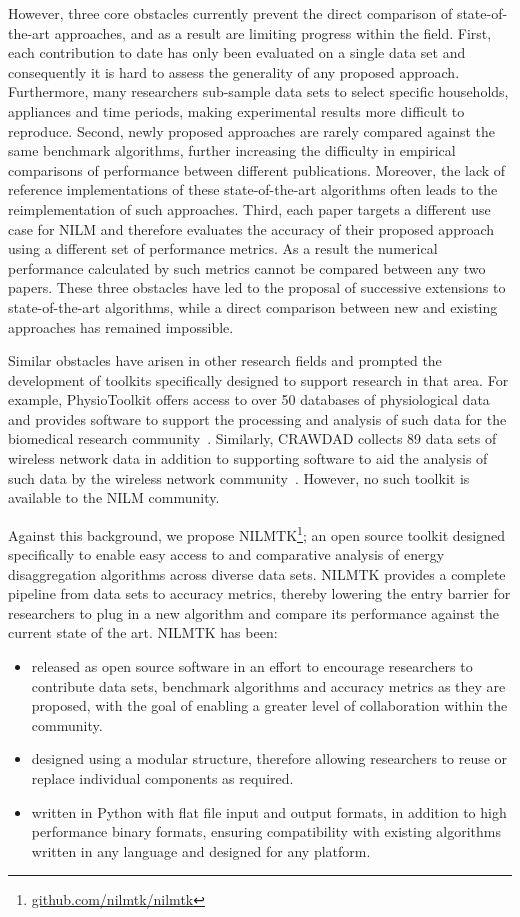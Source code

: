 \documentclass{sig-alternate}
\begin{document}
However, three core obstacles currently prevent the direct comparison of state-of-the-art approaches, and as a result are limiting progress within the field. First, each contribution to date has only been evaluated on a single data set and consequently it is hard to assess the generality of any proposed approach. Furthermore, many researchers sub-sample data sets to select specific households, appliances and time periods, making experimental results more difficult to reproduce. Second, newly proposed approaches are rarely compared against the same benchmark algorithms, further increasing the difficulty in empirical comparisons of performance between different publications. Moreover, the lack of reference implementations of these state-of-the-art algorithms often leads to the reimplementation of such approaches. Third, each paper targets a different use case for NILM and therefore evaluates the accuracy of their proposed approach using a different set of performance metrics. As a result the numerical performance calculated by such metrics cannot be compared between any two papers. These three obstacles have led to the proposal of successive extensions to state-of-the-art algorithms, while a direct comparison between new and existing approaches has remained impossible.

Similar obstacles have arisen in other research fields and prompted the development of toolkits specifically designed to support research in that area. For example, PhysioToolkit offers access to over 50 databases of physiological data and provides software to support the processing and analysis of such data for the biomedical research community~\cite{physionet}. Similarly, CRAWDAD collects 89 data sets of wireless network data in addition to supporting software to aid the analysis of such data by the wireless network community~\cite{crawdad}. However, no such toolkit is available to the NILM community.

Against this background, we propose NILMTK\footnote{\url{github.com/nilmtk/nilmtk}}; an open source toolkit designed specifically to enable easy access to and comparative analysis of energy disaggregation algorithms across diverse data sets. NILMTK provides a complete pipeline from data sets to accuracy metrics, thereby lowering the entry barrier for researchers to plug in a new algorithm and compare its performance against the current state of the art. NILMTK has been:
\begin{itemize}
\item released as open source software in an effort to encourage researchers to contribute data sets, benchmark algorithms and accuracy metrics as they are proposed, with the goal of enabling a greater level of collaboration within the community. 
\item designed using a modular structure, therefore allowing researchers to reuse or replace individual components as required. 
\item written in Python with flat file input and output formats, in addition to high performance binary formats, ensuring compatibility with existing algorithms written in any language and designed for any platform.
\end{itemize}
\end{document}
